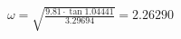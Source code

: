 \documentclass[preview]{standalone}
\begin{document}
\begin{align*}
\omega=\sqrt{\frac{9.81\cdot\tan{1.04441}}{3.29694}}=2.26290
\end{align*}
\end{document}
